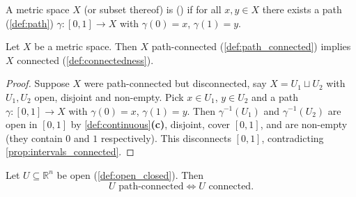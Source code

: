 \begin{definition}
\label{def:path_connected}
A metric space $X$ (or subset thereof) is 
() if for all $x, y \in X$ there exists a path
(\cref{def:path}) $\gamma : [0,1] \to X$ with $\gamma(0) = x$, $\gamma(1) = y$.
\begin{center}
\end{center}
\end{definition}

\begin{lemma}
\label{lem:path_connected_implies_connected}
Let $X$ be a metric space. Then $X$ path-connected (\cref{def:path_connected}) implies $X$
connected (\cref{def:connectedness}).
\end{lemma}

\begin{proof}
Suppose $X$ were path-connected but disconnected, say $X = U_1 \sqcup U_2$ with $U_1,U_2$ open,
disjoint and non-empty. Pick $x \in U_1$, $y \in U_2$ and a path $\gamma : [0,1] \to X$ with
$\gamma(0)=x$, $\gamma(1)=y$. Then $\gamma^{-1}(U_1)$ and $\gamma^{-1}(U_2)$ are open in $[0,1]$
by \cref{def:continuous}\textbf{(c)}, disjoint, cover $[0,1]$, and are non-empty (they contain
$0$ and $1$ respectively). This disconnects $[0,1]$, contradicting
\cref{prop:intervals_connected}.
\end{proof}

\begin{proposition}
\label{prop:open_euclidean_connected_path_connected}
Let $U \subseteq \mathbb{R}^n$ be open (\cref{def:open_closed}). Then
\[
U \text{ path-connected} \iff U \text{ connected}.
\]
\end{proposition}

